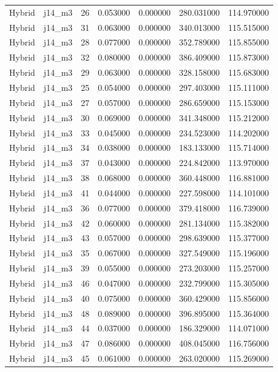 \begin{tabular}{llrrrrr}
Hybrid & j14_m3 & 26 & 0.053000 & 0.000000 & 280.031000 & 114.970000 \\
Hybrid & j14_m3 & 31 & 0.063000 & 0.000000 & 340.013000 & 115.515000 \\
Hybrid & j14_m3 & 28 & 0.077000 & 0.000000 & 352.789000 & 115.855000 \\
Hybrid & j14_m3 & 32 & 0.080000 & 0.000000 & 386.409000 & 115.873000 \\
Hybrid & j14_m3 & 29 & 0.063000 & 0.000000 & 328.158000 & 115.683000 \\
Hybrid & j14_m3 & 25 & 0.054000 & 0.000000 & 297.403000 & 115.111000 \\
Hybrid & j14_m3 & 27 & 0.057000 & 0.000000 & 286.659000 & 115.153000 \\
Hybrid & j14_m3 & 30 & 0.069000 & 0.000000 & 341.348000 & 115.212000 \\
Hybrid & j14_m3 & 33 & 0.045000 & 0.000000 & 234.523000 & 114.202000 \\
Hybrid & j14_m3 & 34 & 0.038000 & 0.000000 & 183.133000 & 115.714000 \\
Hybrid & j14_m3 & 37 & 0.043000 & 0.000000 & 224.842000 & 113.970000 \\
Hybrid & j14_m3 & 38 & 0.068000 & 0.000000 & 360.448000 & 116.881000 \\
Hybrid & j14_m3 & 41 & 0.044000 & 0.000000 & 227.598000 & 114.101000 \\
Hybrid & j14_m3 & 36 & 0.077000 & 0.000000 & 379.418000 & 116.739000 \\
Hybrid & j14_m3 & 42 & 0.060000 & 0.000000 & 281.134000 & 115.382000 \\
Hybrid & j14_m3 & 43 & 0.057000 & 0.000000 & 298.639000 & 115.377000 \\
Hybrid & j14_m3 & 35 & 0.067000 & 0.000000 & 327.549000 & 115.196000 \\
Hybrid & j14_m3 & 39 & 0.055000 & 0.000000 & 273.203000 & 115.257000 \\
Hybrid & j14_m3 & 46 & 0.047000 & 0.000000 & 232.799000 & 115.305000 \\
Hybrid & j14_m3 & 40 & 0.075000 & 0.000000 & 360.429000 & 115.856000 \\
Hybrid & j14_m3 & 48 & 0.089000 & 0.000000 & 396.895000 & 115.364000 \\
Hybrid & j14_m3 & 44 & 0.037000 & 0.000000 & 186.329000 & 114.071000 \\
Hybrid & j14_m3 & 47 & 0.086000 & 0.000000 & 408.045000 & 116.756000 \\
Hybrid & j14_m3 & 45 & 0.061000 & 0.000000 & 263.020000 & 115.269000 \\

\end{tabular}
